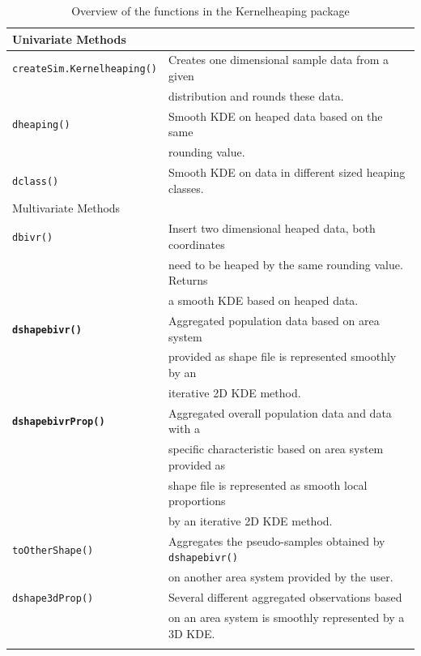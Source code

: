\begin{longtable}{|l | l|}
    \hline
    Univariate Methods & \\
    \hline
    \hline
    \texttt{createSim.Kernelheaping()}& Creates one dimensional sample data from a given  \\
                                      & distribution and rounds these data. \\
    \hline
    \texttt{dheaping()} & Smooth KDE on heaped data based on the same \\ 
                        & rounding value.\\
    \hline 
    \texttt{dclass()} & Smooth KDE on data in different sized heaping classes. \\  
    \hline
    \hline 
    Multivariate Methods & \\
    \hline 
    \hline
    \texttt{dbivr()} & Insert two dimensional heaped data, both coordinates \\
    & need to be heaped by the same rounding value. Returns  \\
    & a smooth KDE based on heaped data. \\
    \hline
    \textbf{\texttt{dshapebivr()}} & Aggregated population data based on area system \\
    & provided as shape file is represented smoothly by an  \\
    & iterative 2D KDE method. \\
    \hline 
    \textbf{\texttt{dshapebivrProp()}} & Aggregated overall population data and data with a  \\ 
    & specific characteristic based on area system provided as  \\
    & shape file is represented as smooth local proportions \\
    & by an iterative 2D KDE method. \\
    \hline
    \texttt{toOtherShape()} & Aggregates the pseudo-samples obtained by \texttt{dshapebivr()} \\ 
    & on another area system provided by the user. \\   
    \hline
    \texttt{dshape3dProp()} & Several different aggregated observations based \\
    & on an area system is smoothly represented by a 3D KDE. \\
    \hline 
    \caption{Overview of the functions in the Kernelheaping package}\label{tab:my_label}
\end{longtable}



